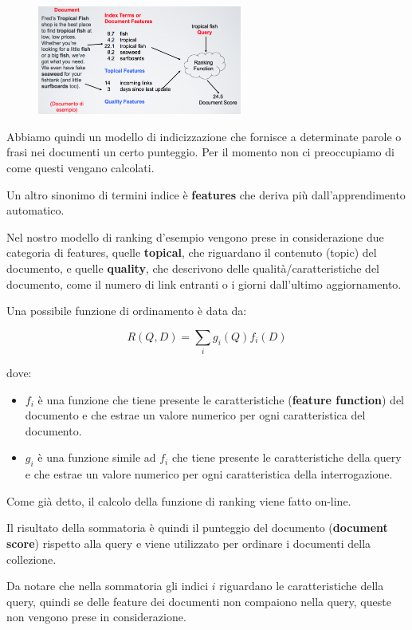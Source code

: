 \begin{figure}[htbp]
	\centering
	\includegraphics[width=0.6\textwidth]{./images/l6-modello}
\end{figure}


\noindent Abbiamo quindi un modello di indicizzazione che fornisce a determinate parole o frasi nei documenti un certo punteggio. Per il momento non ci preoccupiamo di come questi vengano calcolati.

Un altro sinonimo di termini indice è \textbf{features} che deriva più dall'apprendimento automatico.

Nel nostro modello di ranking d'esempio vengono prese in considerazione due categoria di features, quelle \textbf{topical}, che riguardano il contenuto (topic) del documento, e quelle \textbf{quality}, che descrivono delle qualità/caratteristiche del documento, come il numero di link entranti o i giorni dall'ultimo aggiornamento.

Una possibile funzione di ordinamento è data da:

$$
R(Q,D) = \sum_i g_i(Q) f_i(D)
$$

\noindent dove:
\begin{itemize}
	\item $f_i$ è una funzione che tiene presente le caratteristiche (\textbf{feature function}) del documento e che estrae un valore numerico per ogni caratteristica del documento.
	\item $g_i$ è una funzione simile ad $f_i$ che tiene presente le caratteristiche della query e che estrae un valore numerico per ogni caratteristica della interrogazione.
\end{itemize}

\noindent Come già detto, il calcolo della funzione di ranking viene fatto on-line.

Il risultato della sommatoria è quindi il punteggio del documento (\textbf{document score}) rispetto alla query e viene utilizzato per ordinare i documenti della collezione.

Da notare che nella sommatoria gli indici $i$ riguardano le caratteristiche della query, quindi se delle feature dei documenti non compaiono nella query, queste non vengono prese in considerazione.

